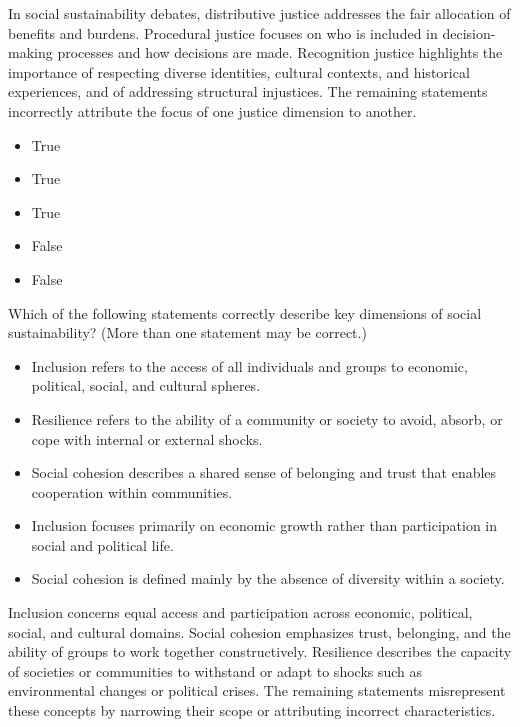 \documentclass[
  a4paper,
  DIV=11,
  numbers=noendperiod,
  oneside,
  openany]{scrreprt}
\providecommand{\tightlist}{%
  \setlength{\itemsep}{0pt}\setlength{\parskip}{0pt}}
\begin{document}
In social sustainability debates, distributive justice addresses the
fair allocation of benefits and burdens. Procedural justice focuses on
who is included in decision-making processes and how decisions are made.
Recognition justice highlights the importance of respecting diverse
identities, cultural contexts, and historical experiences, and of
addressing structural injustices. The remaining statements incorrectly
attribute the focus of one justice dimension to another.

\begin{itemize}
\tightlist
\item
  True
\item
  True
\item
  True
\item
  False
\item
  False
\end{itemize}

Which of the following statements correctly describe key dimensions of
social sustainability? (More than one statement may be correct.)

\begin{itemize}
\tightlist
\item[$\square$]
  Inclusion refers to the access of all individuals and groups to
  economic, political, social, and cultural spheres.
\item[$\square$]
  Resilience refers to the ability of a community or society to avoid,
  absorb, or cope with internal or external shocks.
\item[$\square$]
  Social cohesion describes a shared sense of belonging and trust that
  enables cooperation within communities.
\item[$\square$]
  Inclusion focuses primarily on economic growth rather than
  participation in social and political life.
\item[$\square$]
  Social cohesion is defined mainly by the absence of diversity within a
  society.
\end{itemize}

Inclusion concerns equal access and participation across economic,
political, social, and cultural domains. Social cohesion emphasizes
trust, belonging, and the ability of groups to work together
constructively. Resilience describes the capacity of societies or
communities to withstand or adapt to shocks such as environmental
changes or political crises. The remaining statements misrepresent these
concepts by narrowing their scope or attributing incorrect
characteristics.
\end{document}
